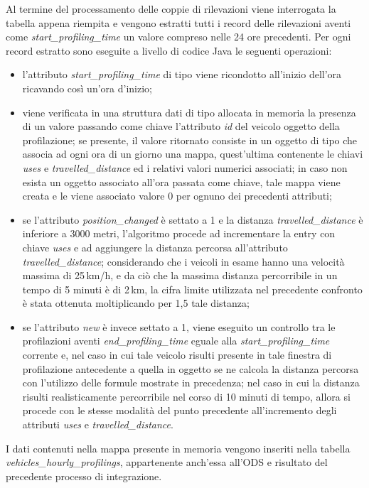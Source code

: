 Al termine del processamento delle coppie di rilevazioni viene interrogata la tabella
appena riempita e vengono estratti tutti i record delle rilevazioni aventi come
\textit{start\_profiling\_time} un valore compreso nelle 24 ore precedenti.
Per ogni record estratto sono eseguite a livello di codice Java le seguenti
operazioni:
\begin{itemize}
\item l'attributo \textit{start\_profiling\_time} di tipo  viene
ricondotto all'inizio dell'ora ricavando così un'ora d'inizio;
\item viene verificata in una struttura dati di tipo  allocata in
memoria la presenza di un valore passando come chiave l'attributo \textit{id}
del veicolo oggetto della profilazione; se presente, il valore ritornato consiste in un
oggetto di tipo  che associa ad ogni ora di un giorno una mappa,
quest'ultima contenente le chiavi \textit{uses} e \textit{travelled\_distance}
ed i relativi valori numerici associati; in caso non esista un oggetto associato
all'ora passata come chiave, tale mappa viene creata e le viene associato
valore 0 per ognuno dei precedenti attributi;
\item se l'attributo \textit{position\_changed} è settato a 1 e la distanza
\textit{travelled\_distance} è inferiore a 3000 metri, l'algoritmo procede
ad incrementare la entry con chiave \textit{uses} e ad aggiungere la distanza
percorsa all'attributo \textit{travelled\_distance}; considerando che i veicoli
in esame hanno una velocità massima di 25\,km/h, e da ciò che la massima distanza
percorribile in un tempo di 5 minuti è di 2\,km, la cifra limite utilizzata nel
precedente confronto è stata ottenuta moltiplicando per 1,5 tale distanza;
\item se l'attributo \textit{new} è invece settato a 1, viene eseguito
un controllo tra le profilazioni aventi \textit{end\_profiling\_time} eguale
alla \textit{start\_profiling\_time} corrente e, nel caso in cui tale veicolo
risulti presente in tale finestra di profilazione antecedente a quella in oggetto
se ne calcola la distanza percorsa con l'utilizzo delle formule mostrate in
precedenza; nel caso in cui la distanza risulti realisticamente percorribile
nel corso di 10 minuti di tempo, allora si procede con le stesse modalità
del punto precedente all'incremento degli attributi \textit{uses} e
\textit{travelled\_distance}.
\end{itemize}
I dati contenuti nella mappa presente in memoria vengono inseriti nella
tabella \textit{vehicles\_hourly\_profilings}, appartenente anch'essa all'ODS
e risultato del precedente processo di integrazione.

